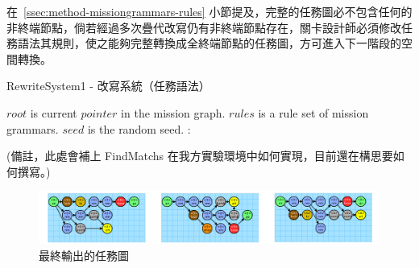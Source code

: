 在~\ref{ssec:method-missiongrammars-rules} 小節提及，完整的任務圖必不包含任何的非終端節點，倘若經過多次疊代改寫仍有非終端節點存在，關卡設計師必須修改任務語法其規則，使之能夠完整轉換成全終端節點的任務圖，方可進入下一階段的空間轉換。

\begin{algorithm}[ht]
    \caption{RewriteSystem1 - 改寫系統（任務語法）}
    \label{alg:algorithm-missiongrammars-rewritesystem}
    \begin{algorithmic}[1]
        \Require
            \Statex $root$ is current $pointer$ in the mission graph.
            \Statex $rules$ is a rule set of mission grammars.
            \Statex $seed$ is the random seed.
        \Ensure
            \EndIf
            :
            \EndFor \\
        \Statex
    \end{algorithmic}
\end{algorithm}


(備註，此處會補上 FindMatchs 在我方實驗環境中如何實現，目前還在構思要如何撰寫。)


\begin{figure}[ht]
  \begin{center}
    \includegraphics[width=1.0\textwidth]{figures/final-mission-graph.png}
    \caption{最終輸出的任務圖} 
    \label{fig:final-mission-graph}
  \end{center}
\end{figure}

